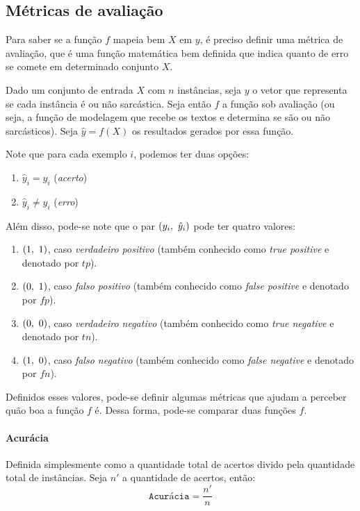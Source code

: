 \subsection{Métricas de avaliação}%
\label{sub:metricas_de_avaliacao}

Para saber se a função $f$ mapeia bem $X$ em $y$, é preciso definir uma métrica
de avaliação, que é uma função matemática bem definida que indica quanto de erro
se comete em determinado conjunto $X$.

Dado um conjunto de entrada $X$ com $n$ instâncias, seja $y$ o vetor que
representa se cada instância é ou não sarcástica. Seja então $f$ a função sob
avaliação (ou seja, a função de modelagem que recebe os textos e determina se
são ou não sarcásticos). Seja $\hat{y}=f(X)$ os resultados gerados por essa
função.

Note que para cada exemplo $i$, podemos ter duas opções:
\begin{enumerate}
  \item $\hat{y}_i=y_i$  (\textit{acerto})
  \item $\hat{y}_i\neq y_i$ (\textit{erro})
\end{enumerate}

Além disso, pode-se note que o par $\left( y_i,~\hat{y}_i \right)$ pode ter quatro
valores:
\begin{enumerate}
  \item $\left( 1,~1 \right)$, caso \textit{verdadeiro positivo} (também conhecido como
    \textit{true positive} e denotado por $tp$).
  \item $\left( 0,~1 \right)$, caso \textit{falso positivo} (também conhecido como
    \textit{false positive} e denotado por $fp$).
  \item $\left( 0,~0 \right)$, caso \textit{verdadeiro negativo} (também conhecido como
    \textit{true negative} e denotado por $tn$).
  \item $\left( 1,~0 \right)$, caso \textit{falso negativo} (também conhecido como
    \textit{false negative} e denotado por $fn$).
\end{enumerate}

Definidos esses valores, pode-se definir algumas métricas que ajudam a perceber
quão boa a função $f$ é. Dessa forma, pode-se comparar duas funções $f$.

\paragraph{Acurácia}%
\label{par:acuracia}

Definida simplesmente como a quantidade total de acertos divido pela quantidade
total de instâncias. Seja $n'$ a quantidade de acertos, então:
\[
\texttt{Acurácia} = \dfrac{n'}{n}
\]

